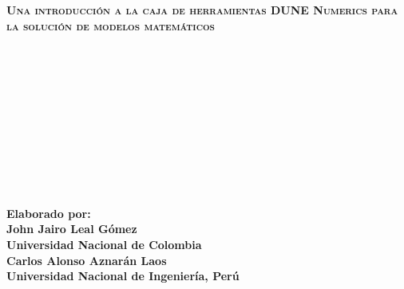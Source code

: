 {
\begin{frame}

	\color{c++reviewduneblue}

	\begin{flushleft}\bfseries\scshape\huge
		Una introducción a la caja de herramientas DUNE Numerics
		para la solución de modelos matemáticos
	\end{flushleft}

	\

	\

	\

	\

	\

	\

	\begin{minipage}{0.5\textwidth}
		\begin{flushright}
			\large
			\bfseries
			Elaborado por:\\
			John Jairo Leal Gómez\\
			Universidad Nacional de Colombia\\
			Carlos Alonso Aznarán Laos\\
			Universidad Nacional de Ingeniería, Perú
		\end{flushright}
	\end{minipage}
\end{frame}
}